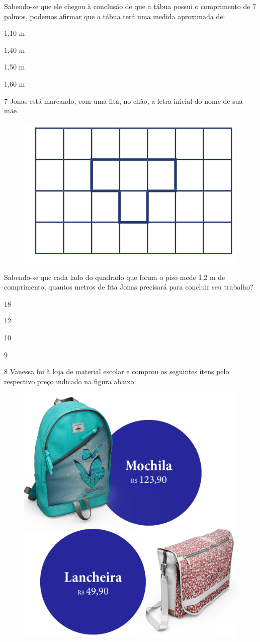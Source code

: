Sabendo-se que ele chegou à conclusão de que a tábua possui o comprimento
de 7 palmos, podemos afirmar que a tábua terá uma medida aproximada
de:

\begin{minipage}{.5\textwidth}
\begin{escolha}
\item
  1,10 m
\item
  1,40 m
\item
  1,50 m
\item
  1,60 m
\end{escolha}
\end{minipage}



\num{7} Jonas está marcando, com uma fita, no chão, a letra inicial
do nome de sua mãe.

\begin{figure}[htpb!]
\centering
\includegraphics[width=.5\textwidth]{../ilustracoes/MAT5/SAEB_5ANO_MAT_figura118.png}
\end{figure}

\pagebreak
Sabendo-se que cada lado do quadrado que forma o piso mede 1,2 m de
comprimento, quantos metros de fita Jonas precisará para concluir seu
trabalho?

\begin{minipage}{.5\textwidth}
\begin{escolha}
\item
  18
\item
  12
\item
  10
\item
  9
\end{escolha}
\end{minipage}


\num{8} Vanessa foi à loja de material escolar e comprou os seguintes
itens pelo respectivo preço indicado na figura abaixo:

\begin{figure}[htpb!]
\centering
\includegraphics[width=.5\textwidth]{../ilustracoes/MAT5/SAEB_5ANO_MAT_figura119.png}
\end{figure}

